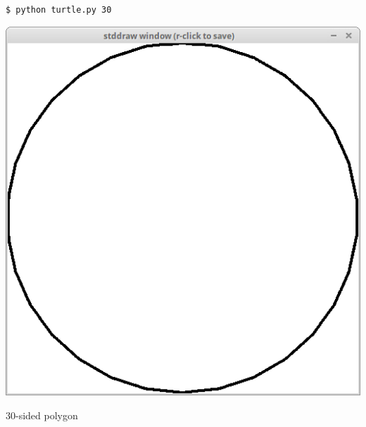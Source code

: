 \documentclass[8pt,a4paper,compress,handout]{beamer}
\begin{document}
\begin{frame}[fragile]
\begin{minipage}{200pt}
\begin{lstlisting}[language={}]
$ python turtle.py 30
\end{lstlisting}
\end{minipage}%
\hfill
\begin{minipage}{100pt}
\begin{center}
\includegraphics[scale=0.12]{figures/turtle3.png}

\smallskip

\tiny 30-sided polygon
\end{center}
\end{minipage}%
\end{frame}
\end{document}
